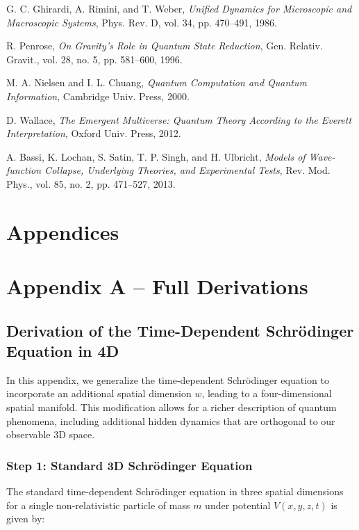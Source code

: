 \documentclass[12pt]{article}
\begin{document}
\begin{thebibliography}{99}
G. C. Ghirardi, A. Rimini, and T. Weber, \textit{Unified Dynamics for Microscopic and Macroscopic Systems}, Phys. Rev. D, vol. 34, pp. 470–491, 1986.

R. Penrose, \textit{On Gravity's Role in Quantum State Reduction}, Gen. Relativ. Gravit., vol. 28, no. 5, pp. 581–600, 1996.

M. A. Nielsen and I. L. Chuang, \textit{Quantum Computation and Quantum Information}, Cambridge Univ. Press, 2000.

D. Wallace, \textit{The Emergent Multiverse: Quantum Theory According to the Everett Interpretation}, Oxford Univ. Press, 2012.

A. Bassi, K. Lochan, S. Satin, T. P. Singh, and H. Ulbricht, \textit{Models of Wave-function Collapse, Underlying Theories, and Experimental Tests}, Rev. Mod. Phys., vol. 85, no. 2, pp. 471–527, 2013.

\end{thebibliography}



\appendix
\section*{Appendices}

\section{Appendix A – Full Derivations}
\subsection{Derivation of the Time-Dependent Schrödinger Equation in 4D}

In this appendix, we generalize the time-dependent Schrödinger equation to incorporate an additional spatial dimension \( w \), leading to a four-dimensional spatial manifold. This modification allows for a richer description of quantum phenomena, including additional hidden dynamics that are orthogonal to our observable 3D space.

\subsubsection*{Step 1: Standard 3D Schrödinger Equation}

The standard time-dependent Schrödinger equation in three spatial dimensions for a single non-relativistic particle of mass \( m \) under potential \( V(x, y, z, t) \) is given by:
\end{document}
